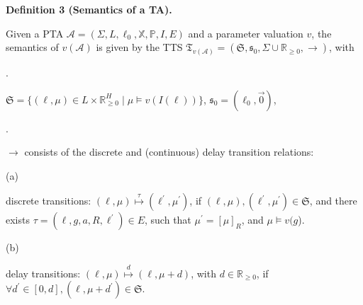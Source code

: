  
 
\par\medskip\noindent\textbf{Definition 3 (Semantics of a TA).}\par
 
 
Given a PTA $\mathcal{A}=(\Sigma,L,\mathrm{\mathrm{\ell}_{0}},\mathbb{X},\mathbb{P},I,E)$ and a parameter valuation $v$, the semantics of $v(\mathcal{A})$ is given by the TTS $\mathfrak{T}_{v(\mathcal{A})}=(\mathfrak{S},\mathfrak{s}_{0},\Sigma\cup\mathbb{R}_{\geq 0},{\rightarrow})$, with\par
  
\par{}. 
 
$\mathfrak{S}=\big\{(\mathrm{\ell},\mu)\in L\times\mathbb{R}_{\geq 0}^{H}\mid\mu\models v(I(\mathrm{\ell}))\big\}$, $\mathfrak{s}_{0}=(\mathrm{\mathrm{\ell}_{0}},\vec{0})$,\par
 
 
 
\par{}. 
 
${\rightarrow}$ consists of the discrete and (continuous) delay transition relations:\par
  
\par\noindent  (a) 
 
discrete transitions: $(\mathrm{\ell},\mu)\stackrel{{\scriptstyle\tau}}{{\mapsto}}(\mathrm{\ell}^{\prime},\mu^{\prime})$, if $(\mathrm{\ell},\mu),(\mathrm{\ell}^{\prime},\mu^{\prime})\in\mathfrak{S}$, and there exists $\tau=(\mathrm{\ell},g,a,R,\mathrm{\ell}^{\prime})\in E$, such that $\mu^{\prime}=[\mu]_{R}$, and $\mu\models v(g$).\par
 
 
 
\par\noindent  (b) 
 
delay transitions: $(\mathrm{\ell},\mu)\stackrel{{\scriptstyle d}}{{\mapsto}}(\mathrm{\ell},\mu+d)$, with $d\in\mathbb{R}_{\geq 0}$, if $\forall d^{\prime}\in[0,d],(\mathrm{\ell},\mu+d^{\prime})\in\mathfrak{S}$.\par
 
 
  
 
